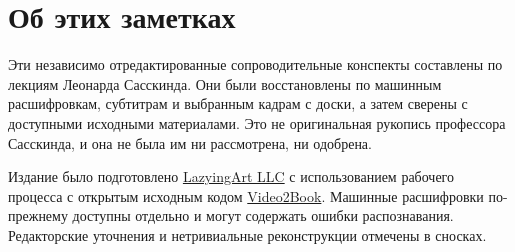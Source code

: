 \documentclass[11pt,oneside]{book}
\begin{document}
\frontmatter
\hypersetup{pageanchor=false}

\hypersetup{pageanchor=true}

\clearpage
\chapter*{Об этих заметках}
Эти независимо отредактированные сопроводительные конспекты составлены по лекциям Леонарда Сасскинда. Они были восстановлены по машинным расшифровкам, субтитрам и выбранным кадрам с доски, а затем сверены с доступными исходными материалами. Это не оригинальная рукопись профессора Сасскинда, и она не была им ни рассмотрена, ни одобрена.

Издание было подготовлено \href{https://lazying.art}{LazyingArt LLC} с использованием рабочего процесса с открытым исходным кодом \href{https://github.com/lachlanchen/Video2Book}{Video2Book}. Машинные расшифровки по-прежнему доступны отдельно и могут содержать ошибки распознавания. Редакторские уточнения и нетривиальные реконструкции отмечены в сносках.
\clearpage
\tableofcontents
\mainmatter










\end{document}
